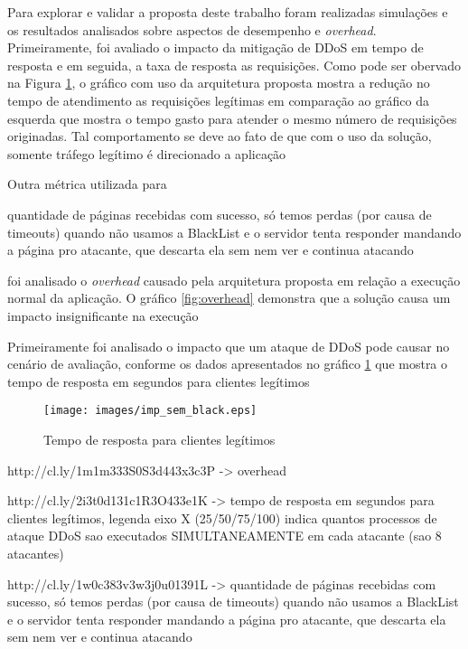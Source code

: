 
Para explorar e validar a proposta deste trabalho foram realizadas simulações e os resultados analisados sobre aspectos de desempenho e \emph{overhead}. Primeiramente, foi avaliado o impacto da mitigação de DDoS em tempo de resposta e em seguida, a taxa de resposta as requisições. Como pode ser obervado na Figura \ref{fig:imp_sem_black}, o gráfico com uso da arquitetura proposta mostra a redução no tempo de atendimento as requisições legítimas em comparação ao gráfico da esquerda que mostra o tempo gasto para atender o mesmo número de requisições originadas. Tal comportamento se deve ao fato de que com o uso da solução, somente tráfego legítimo é direcionado a aplicação  

Outra métrica utilizada para 

quantidade de páginas recebidas com sucesso, só temos perdas (por causa de timeouts) quando não usamos a BlackList e o servidor tenta responder mandando a página pro atacante, que descarta ela sem nem ver e continua atacando


foi analisado o \emph{overhead} causado pela arquitetura proposta em relação a execução normal da aplicação. O gráfico \ref{fig:overhead} demonstra que a solução causa um impacto insignificante na execução 

Primeiramente foi analisado o impacto que um ataque de DDoS pode causar no cenário de avaliação, conforme os dados apresentados no gráfico \ref{fig:imp_sem_black} que mostra o tempo de resposta em segundos para clientes legítimos

\begin{figure}[h!]
\centering
\texttt{[image: images/imp\_sem\_black.eps]}
\caption{Tempo de resposta para clientes legítimos}
\label{fig:imp_sem_black}
\end{figure}

http://cl.ly/1m1m333S0S3d443x3c3P -> overhead



http://cl.ly/2i3t0d131c1R3O433e1K -> tempo de resposta em segundos para clientes legítimos, legenda eixo X (25/50/75/100) indica quantos processos de ataque DDoS sao executados SIMULTANEAMENTE em cada atacante (sao 8 atacantes)



http://cl.ly/1w0c383v3w3j0u01391L -> quantidade de páginas recebidas com sucesso, só temos perdas (por causa de timeouts) quando não usamos a BlackList e o servidor tenta responder mandando a página pro atacante, que descarta ela sem nem ver e continua atacando


